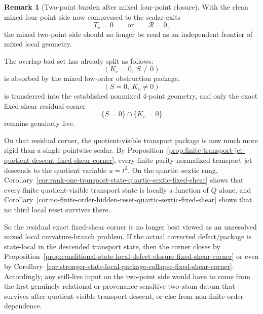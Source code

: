 \documentclass[11pt,a4paper]{amsart}
\theoremstyle{plain}
\theoremstyle{definition}
\newtheorem{remark}[theorem]{Remark}
\begin{document}
\begin{remark}[Two-point burden after mixed four-point closure]
\label{rem:two-point-burden-after-mixed-four-point-closure}
With the clean mixed four-point side now compressed to the scalar exits
\[
T_v=0
\qquad\text{or}\qquad
\mathcal R=0,
\]
the mixed two-point side should no longer be read as an independent frontier of
mixed local geometry.

The overlap bad set has already split as follows:
\[
(K_v=0,\ S\neq 0)
\]
is absorbed by the mixed low-order obstruction package,
\[
(S=0,\ K_v\neq 0)
\]
is transferred into the established nonmixed $4$-point geometry,
and only the exact fixed-shear residual corner
\[
\{S=0\}\cap\{K_v=0\}
\]
remains genuinely live.

On that residual corner, the quotient-visible transport package is now much
more rigid than a single pointwise scalar. By
Proposition~\ref{prop:finite-transport-jet-quotient-descent-fixed-shear-corner},
every finite parity-normalized transport jet descends to the quotient variable
$u=t^2$. On the quartic--sextic rung,
Corollary~\ref{cor:rank-one-transport-state-quartic-sextic-fixed-shear} shows
that every finite quotient-visible transport state is locally a function of
$Q$ alone, and
Corollary~\ref{cor:no-finite-order-hidden-reset-quartic-sextic-fixed-shear}
shows that no third local reset survives there.

So the residual exact fixed-shear corner is no longer best viewed as an
unresolved mixed local curvature-branch problem. If the actual corrected
defect/package is state-local in the descended transport state, then the corner
closes by
Proposition~\ref{prop:conditional-state-local-defect-closure-fixed-shear-corner}
or even by
Corollary~\ref{cor:stronger-state-local-package-collapse-fixed-shear-corner}.
Accordingly, any still-live input on the two-point side would have to come from
the first genuinely relational or provenance-sensitive two-atom datum that
survives after quotient-visible transport descent, or else from non-finite-order
dependence.
\end{remark}
\end{document}
